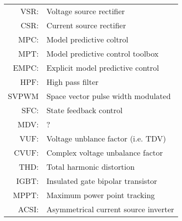 \begin{longtable}{r l}
  VSR:      & Voltage source rectifier \\
  CSR:      & Current source rectifier \\
  MPC:      & Model predictive coltrol\\
  MPT:      & Model predictive control toolbox\\
  EMPC:     & Explicit model predictive control\\
  HPF:      & High pass filter\\
  SVPWM     & Space vector pulse width modulated\\
  SFC:      & State feedback control\\
  MDV:      & ?\\
  VUF:      & Voltage unblance factor (i.e. TDV)\\
	CVUF:			& Complex voltage unbalance factor\\
  THD:      & Total harmonic distortion\\
  IGBT:     & Insulated gate bipolar transistor\\
  MPPT:     & Maximum power point tracking\\
	ACSI:			& Asymmetrical current source inverter\\

\end{longtable} 